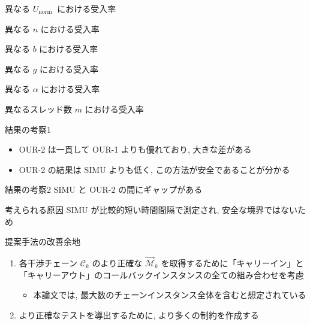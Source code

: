 \begin{frame}{異なる $U_{\text {norm }}$ における受入率}
\end{frame}

\begin{frame}{異なる $n$ における受入率}
\end{frame}

\begin{frame}{異なる $b$ における受入率}
\end{frame}

\begin{frame}{異なる $g$ における受入率}
\end{frame}

\begin{frame}{異なる $\alpha$ における受入率}
\end{frame}

\begin{frame}{異なるスレッド数 $m$ における受入率}
\end{frame}

\begin{frame}{結果の考察1}
    \begin{itemize}
        \item OUR-2 は一貫して OUR-1 よりも優れており, 大きな差がある
        \item OUR-2 の結果は SIMU よりも低く, この方法が安全であることが分かる
    \end{itemize}
\end{frame}

\begin{frame}{結果の考察2}
    SIMU と OUR-2 の間にギャップがある
    \begin{block}{考えられる原因}
        SIMU が比較的短い時間間隔で測定され, 安全な境界ではないため
    \end{block}
\end{frame}

\begin{frame}{提案手法の改善余地}
    \begin{enumerate}
        \item 各干渉チェーン $\mathcal{C}_{k}$ のより正確な $\overrightarrow{\mathcal{M}}_{k}$ を取得するために「キャリーイン」と「キャリーアウト」のコールバックインスタンスの全ての組み合わせを考慮
              \begin{itemize}
                  \item 本論文では, 最大数のチェーンインスタンス全体を含むと想定されている
              \end{itemize}
        \item より正確なテストを導出するために, より多くの制約を作成する
    \end{enumerate}
\end{frame}


